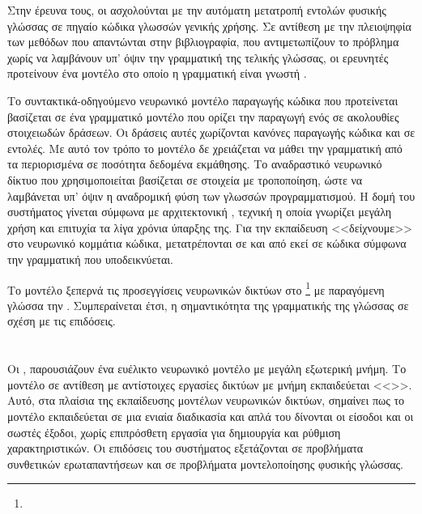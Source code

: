 Στην έρευνα τους, οι  \cite{Yin2017} ασχολούνται με την αυτόματη μετατροπή εντολών φυσικής γλώσσας σε πηγαίο κώδικα γλωσσών γενικής χρήσης.
Σε αντίθεση με την πλειοψηφία των μεθόδων που απαντώνται στην βιβλιογραφία, που αντιμετωπίζουν το πρόβλημα χωρίς να λαμβάνουν υπ' όψιν την γραμματική της τελικής γλώσσας, οι ερευνητές προτείνουν ένα μοντέλο στο οποίο η γραμματική είναι γνωστή .

Το συντακτικά-οδηγούμενο νευρωνικό μοντέλο παραγωγής κώδικα που προτείνεται βασίζεται σε ένα γραμματικό μοντέλο που ορίζει την παραγωγή ενός  σε ακολουθίες στοιχειωδών δράσεων.
Οι δράσεις αυτές χωρίζονται κανόνες παραγωγής κώδικα και σε εντολές.
Με αυτό τον τρόπο το μοντέλο δε χρειάζεται να μάθει την γραμματική από τα περιορισμένα σε ποσότητα δεδομένα εκμάθησης.
Το αναδραστικό νευρωνικό δίκτυο που χρησιμοποιείται βασίζεται σε στοιχεία  με τροποποίηση, ώστε να λαμβάνεται υπ' όψιν η αναδρομική φύση των γλωσσών προγραμματισμού.
Η δομή του συστήματος γίνεται σύμφωνα με αρχιτεκτονική  \cite{Bahdanau2014}, τεχνική η οποία γνωρίζει μεγάλη χρήση και επιτυχία τα λίγα χρόνια ύπαρξης της.
Για την εκπαίδευση <<δείχνουμε>> στο νευρωνικό κομμάτια κώδικα, μετατρέπονται σε  και από εκεί σε κώδικα σύμφωνα την γραμματική που υποδεικνύεται.

Το μοντέλο ξεπερνά τις  προσεγγίσεις νευρωνικών δικτύων στο \footnote{}
 με παραγόμενη γλώσσα την .
Συμπεραίνεται έτσι, η σημαντικότητα της γραμματικής της γλώσσας σε σχέση με τις επιδόσεις. 

\section{}

Οι , \cite{Sukhbaatar2015} παρουσιάζουν ένα ευέλικτο νευρωνικό μοντέλο με μεγάλη εξωτερική μνήμη. 
Το μοντέλο σε αντίθεση με αντίστοιχες εργασίες δικτύων με μνήμη εκπαιδεύεται <<>>. Αυτό, στα πλαίσια της εκπαίδευσης μοντέλων νευρωνικών δικτύων, σημαίνει πως το μοντέλο εκπαιδεύεται σε μια ενιαία διαδικασία και απλά του δίνονται οι είσοδοι και οι σωστές έξοδοι, χωρίς επιπρόσθετη εργασία για δημιουργία και ρύθμιση χαρακτηριστικών. Οι επιδόσεις του συστήματος εξετάζονται σε προβλήματα συνθετικών ερωταπαντήσεων και σε προβλήματα μοντελοποίησης φυσικής γλώσσας.

